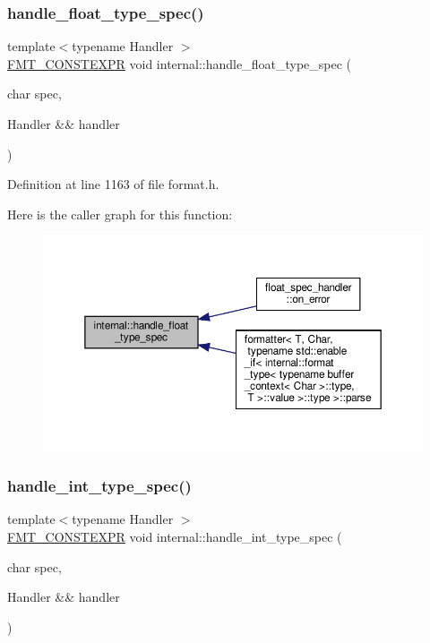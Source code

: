 \subsubsection{\texorpdfstring{handle\+\_\+float\+\_\+type\+\_\+spec()}{handle\_float\_type\_spec()}}
{\footnotesize\ttfamily template$<$typename Handler $>$ \\
\hyperlink{core_8h_a69201cb276383873487bf68b4ef8b4cd}{F\+M\+T\+\_\+\+C\+O\+N\+S\+T\+E\+X\+PR} void internal\+::handle\+\_\+float\+\_\+type\+\_\+spec (\begin{DoxyParamCaption}\item[{char}]{spec,  }\item[{Handler \&\&}]{handler }\end{DoxyParamCaption})}



Definition at line 1163 of file format.\+h.

Here is the caller graph for this function\+:
\nopagebreak
\begin{figure}[H]
\begin{center}
\leavevmode
\includegraphics[width=350pt]{namespaceinternal_a68abded0076fd30fc64b6cd044b15b64_icgraph}
\end{center}
\end{figure}
\mbox{\label{namespaceinternal_a8a719221b08b552a41e8b24ff4fa60a0}} 
\subsubsection{\texorpdfstring{handle\+\_\+int\+\_\+type\+\_\+spec()}{handle\_int\_type\_spec()}}
{\footnotesize\ttfamily template$<$typename Handler $>$ \\
\hyperlink{core_8h_a69201cb276383873487bf68b4ef8b4cd}{F\+M\+T\+\_\+\+C\+O\+N\+S\+T\+E\+X\+PR} void internal\+::handle\+\_\+int\+\_\+type\+\_\+spec (\begin{DoxyParamCaption}\item[{char}]{spec,  }\item[{Handler \&\&}]{handler }\end{DoxyParamCaption})}



